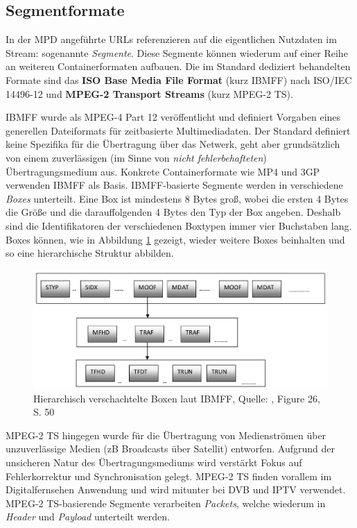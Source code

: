 \documentclass[paper = a4, fontsize = 12pt, parskip = half]{scrartcl} %
\begin{document}
\subsection{Segmentformate}
\label{segment_formats}
In der MPD angeführte URLs referenzieren auf die eigentlichen Nutzdaten im Stream: sogenannte \textit{Segmente}. Diese Segmente können wiederum auf einer Reihe an weiteren Containerformaten aufbauen. Die im Standard dediziert behandelten Formate sind das \textbf{ISO Base Media File Format} (kurz IBMFF) nach ISO/IEC 14496-12 \cite{ibmff_mpeg} und \textbf{MPEG-2 Transport Streams} \cite{mpeg2} (kurz MPEG-2 TS).

IBMFF wurde als MPEG-4 Part 12 veröffentlicht und definiert Vorgaben eines generellen Dateiformats für zeitbasierte Multimediadaten. Der Standard definiert keine Spezifika für die Übertragung über das Netwerk, geht aber grundsätzlich von einem zuverlässigen (im Sinne von \textit{nicht fehlerbehafteten}) Übertragungsmedium aus. Konkrete Containerformate wie MP4 und 3GP verwenden IBMFF als Basis. IBMFF-basierte Segmente werden in verschiedene \textit{Boxes} unterteilt. Eine Box ist mindestens 8 Bytes groß, wobei die ersten 4 Bytes die Größe und die darauffolgenden 4 Bytes den Typ der Box angeben. Deshalb sind die Identifikatoren der verschiedenen Boxtypen immer vier Buchstaben lang. Boxes können, wie in Abbildung \ref{ibmff_boxes} gezeigt, wieder weitere Boxes beinhalten und so eine hierarchische Struktur abbilden.

\begin{figure}[ht]
	\centering
	\includegraphics[width=12cm]{images/isobmff_boxes.png}
	\caption{Hierarchisch verschachtelte Boxen laut IBMFF, Quelle: \cite{mazhar_compliance_2011}, Figure 26, S. 50}
	\label{ibmff_boxes}
\end{figure}

MPEG-2 TS hingegen wurde für die Übertragung von Medienströmen über unzuverlässige Medien (zB Broadcasts über Satellit) entworfen. Aufgrund der unsicheren Natur des Übertragungsmediums wird verstärkt Fokus auf Fehlerkorrektur und Synchronisation gelegt. MPEG-2 TS finden vorallem im Digitalfernsehen Anwendung und wird mitunter bei DVB und IPTV verwendet. MPEG-2 TS-basierende Segmente verarbeiten \textit{Packets}, welche wiederum in \textit{Header} und \textit{Payload} unterteilt werden.
\end{document}
